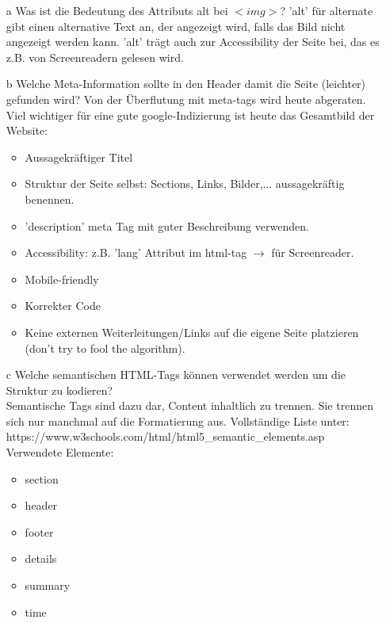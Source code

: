 \documentclass[12pt, a4paper]{report}
\begin{document}
\begin{itemize}
  \item[a] Was ist die Bedeutung des Attributs alt bei $<img>$?
  'alt' für alternate gibt einen alternative Text an, der angezeigt wird, falls das Bild nicht
  angezeigt werden kann. 'alt' trägt auch zur Accessibility der Seite bei, das es z.B. von Screenreadern
  gelesen wird.
  \item[b] Welche Meta-Information sollte in den Header damit die Seite (leichter) gefunden wird?
  Von der Überflutung mit meta-tags wird heute abgeraten. Viel wichtiger für eine gute google-Indizierung ist
  heute das Gesamtbild der Website:
  \begin{itemize}
  	\item Aussagekräftiger Titel
  	\item Struktur der Seite selbst: Sections, Links, Bilder,... aussagekräftig benennen.
  	\item 'description' meta Tag mit guter Beschreibung verwenden.
  	\item Accessibility: z.B. 'lang' Attribut im html-tag $\rightarrow$ für Screenreader.
  	\item Mobile-friendly
  	\item Korrekter Code
  	\item Keine externen Weiterleitungen/Links auf die eigene Seite platzieren (don't try to fool the algorithm).
  \end{itemize}
  \item[c] Welche semantischen HTML-Tags können verwendet werden um die Struktur zu kodieren?\\
  Semantische Tags sind dazu dar, Content inhaltlich zu trennen. Sie trennen sich nur manchmal auf die
  Formatierung aus.
  Vollständige Liste unter:\\
  https://www.w3schools.com/html/html5\_semantic\_elements.asp\\
  Verwendete Elemente:\\
  \begin{itemize}
  	\item section
  	\item header
  	\item footer
  	\item details
  	\item summary
  	\item time
  \end{itemize}
\end{itemize}
\end{document}
